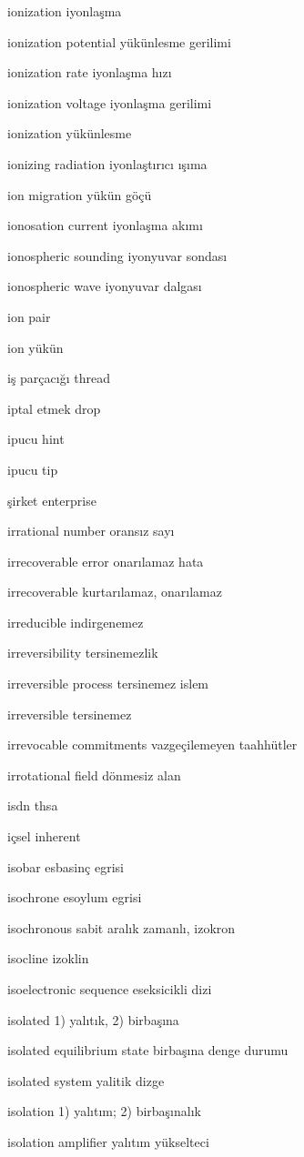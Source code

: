 \documentclass[12pt,fleqn]{article}\usepackage{../../common}
\begin{document}
ionization iyonlaşma

ionization potential yükünlesme gerilimi

ionization rate iyonlaşma hızı

ionization voltage iyonlaşma gerilimi

ionization yükünlesme

ionizing radiation iyonlaştırıcı ışıma

ion migration yükün göçü

ionosation current iyonlaşma akımı

ionospheric sounding iyonyuvar sondası

ionospheric wave iyonyuvar dalgası

ion pair

ion yükün

iş parçacığı thread

iptal etmek drop

ipucu hint

ipucu tip

şirket enterprise

irrational number oransız sayı

irrecoverable error onarılamaz hata

irrecoverable kurtarılamaz, onarılamaz

irreducible indirgenemez

irreversibility tersinemezlik

irreversible process tersinemez islem

irreversible tersinemez

irrevocable commitments vazgeçilemeyen taahhütler

irrotational field dönmesiz alan

isdn thsa

içsel inherent

isobar esbasinç egrisi

isochrone esoylum egrisi

isochronous sabit aralık zamanlı, izokron

isocline izoklin

isoelectronic sequence eseksicikli dizi

isolated 1) yalıtık, 2) birbaşına

isolated equilibrium state birbaşına denge durumu

isolated system yalitik dizge

isolation 1) yalıtım; 2) birbaşınalık

isolation amplifier yalıtım yükselteci
\end{document}
